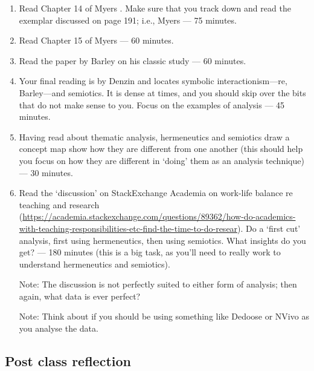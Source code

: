 \documentclass[]{book}
\theoremstyle{definition}
\theoremstyle{definition}
\theoremstyle{definition}
\theoremstyle{remark}
\begin{document}
\begin{enumerate}
\def\labelenumi{\arabic{enumi}.}
\item
  Read Chapter 14 of Myers \autocite*[
  p.~183--196]{myers_2013_qualitativeresearchbusiness}. Make sure that
  you track down and read the exemplar discussed on page 191; i.e.,
  Myers \autocite*{myers_1994_disastereveryonesee} --- 75 minutes.
\item
  Read Chapter 15 of Myers \autocite*[
  p.~197--208]{myers_2013_qualitativeresearchbusiness} --- 60 minutes.
\item
  Read the paper by Barley \autocite*{barley_1990_imagesimagingnotes} on
  his classic study \autocite*[ which you do not need to
  read]{barley_1986_technologyoccasionstructuring} --- 60 minutes.
\item
  Your final reading is by Denzin
  \autocite*{denzin_1987_semioticssymbolicinteractionism} and locates
  symbolic interactionism---re, Barley---and semiotics. It is dense at
  times, and you should skip over the bits that do not make sense to
  you. Focus on the examples of analysis --- 45 minutes.
\item
  Having read about thematic analysis, hermeneutics and semiotics draw a
  concept map show how they are different from one another (this should
  help you focus on how they are different in `doing' them as an
  analysis technique) --- 30 minutes.
\item
  Read the `discussion' on StackExchange Academia on work-life balance
  re teaching and research
  (\url{https://academia.stackexchange.com/questions/89362/how-do-academics-with-teaching-responsibilities-etc-find-the-time-to-do-resear}).
  Do a `first cut' analysis, first using hermeneutics, then using
  semiotics. What insights do you get? --- 180 minutes (this is a big
  task, as you'll need to really work to understand hermeneutics and
  semiotics).

  Note: The discussion is not perfectly suited to either form of
  analysis; then again, what data is ever perfect?

  Note: Think about if you should be using something like Dedoose or
  NVivo as you analyse the data.
\end{enumerate}

\hypertarget{post-class-reflection-7}{%
\subsection*{Post class reflection}\label{post-class-reflection-7}}
\end{document}
